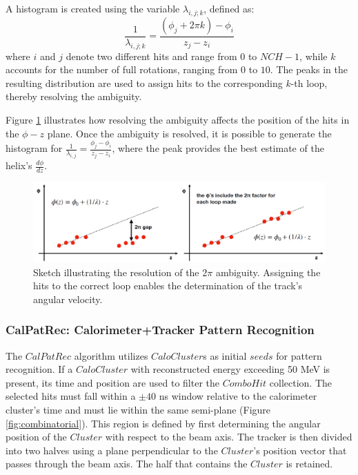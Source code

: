 A histogram is created using the variable $\lambda_{i,j;k}$, defined as:
\begin{equation}
    \frac{1}{\lambda_{i, j ; k}}=\frac{\left(\phi_j+2 \pi k\right)-\phi_i}{z_j-z_i}
\end{equation}
where $i$ and $j$ denote two different hits and range 
from $0$ to $NCH -1$, while $k$ accounts for the number 
of full rotations, ranging from $0$ to $10$. The peaks in 
the resulting distribution are used to assign hits to the 
corresponding $k$-th loop, thereby resolving the ambiguity.

Figure \ref{fig:ambiguity} illustrates how resolving the 
ambiguity affects the position of the hits in the $\phi - z$ plane. 
Once the ambiguity is resolved, it is possible to generate the 
histogram for $\frac{1}{\lambda_{i,j}} = \frac{\phi_j - \phi_i}{z_j - z_i}$, 
where the peak provides the best estimate of the helix's $\frac{d\phi}{dz}$.

\begin{figure}[!h]
    \centering
    \includegraphics[width =\textwidth]{figures/png/Screenshot_20240810_160405.png}
    \caption[Sketch of the resolution of the 2$\pi$ ambiguity.]{Sketch illustrating the resolution of the 2$\pi$ ambiguity. 
    Assigning the hits to the correct loop enables the determination of the track's angular velocity.}
    \label{fig:ambiguity}
\end{figure}

\subsubsection{CalPatRec: Calorimeter+Tracker Pattern Recognition}

The $CalPatRec$ algorithm utilizes $CaloCluster$s as initial $seeds$ for 
pattern recognition. If a $CaloCluster$ with reconstructed energy exceeding 
50 MeV is present, its time and position are used to filter the $ComboHit$ 
collection. The selected hits must fall within a $\pm 40$ ns window relative 
to the calorimeter cluster's time and must lie within the same semi-plane 
(Figure \ref{fig:combinatorial}). This region is defined by first 
determining the angular position of the $Cluster$ with respect to the 
beam axis. The tracker is then divided into two halves using a plane 
perpendicular to the $Cluster$'s position vector that passes through 
the beam axis. The half that contains the $Cluster$ is retained.

